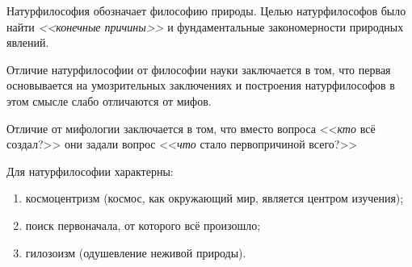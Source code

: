 
Натурфилософия обозначает философию природы. Целью натурфилософов было найти \textit{<<конечные причины>>} и фундаментальные закономерности природных явлений. 

Отличие натурфилософии от философии науки заключается в том, что первая основывается на умозрительных заключениях и построения натурфилософов в этом смысле слабо отличаются от мифов.

Отличие от мифологии заключается в том, что вместо вопроса <<\textit{кто} всё создал?>> они задали вопрос <<\textit{что} стало первопричиной всего?>> 

Для натурфилософии характерны:
\begin{enumerate}
	\item космоцентризм (космос, как окружающий мир, является центром изучения);
	\item поиск первоначала, от которого всё произошло;
	\item гилозоизм (одушевление неживой природы).
\end{enumerate}

